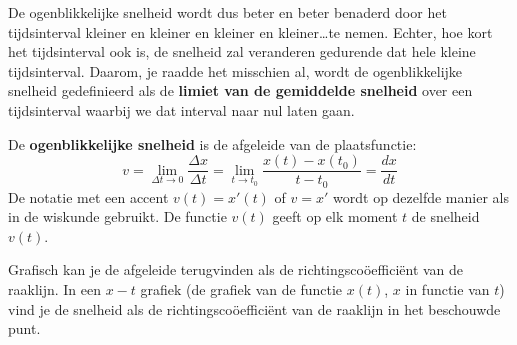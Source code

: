 \documentclass{ximera}
\begin{document}
\begin{image}[\textwidth]
\end{image}	

De ogenblikkelijke snelheid wordt dus beter en beter benaderd door het tijdsinterval kleiner en kleiner en kleiner en kleiner\ldots te nemen. 
Echter, hoe kort het tijdsinterval ook is, de snelheid zal veranderen gedurende dat hele kleine tijdsinterval.
Daarom, je raadde het misschien al, wordt de ogenblikkelijke snelheid gedefinieerd als de \textbf{limiet van de gemiddelde snelheid} over een tijdsinterval waarbij we dat interval naar nul laten gaan. 

\begin{definition}
	
De \textbf{ogenblikkelijke snelheid}  is de afgeleide van de plaatsfunctie:
\[
v=\lim_{\Delta t\to 0}\frac{\Delta x}{\Delta t}=\lim_{t\to t_0}\frac{x(t)-x(t_0)}{t-t_0}=\frac{dx}{dt}
\]
De notatie met een accent $v(t)=x'(t)$ of $v=x'$ wordt op dezelfde manier als in de wiskunde gebruikt. 
De functie $v(t)$ geeft op elk moment $t$ de snelheid $v(t)$. 
\end{definition}


Grafisch kan je de afgeleide terugvinden als de richtingscoöefficiënt van de raaklijn. In een $x-t$ grafiek (de grafiek van de functie $x(t)$, $x$ in functie van $t$) vind je  de snelheid als de richtingscoöefficiënt van de raaklijn in het beschouwde punt. 
\end{document}
